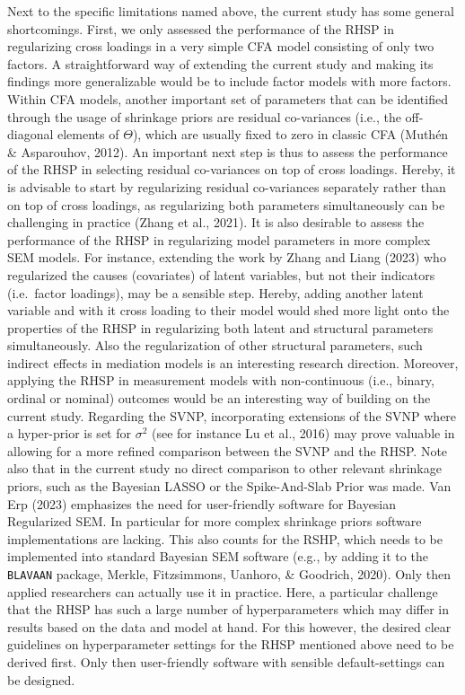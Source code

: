 \documentclass[
  man, donotrepeattitle,floatsintext]{apa6}
\begin{document}
Next to the specific limitations named above, the current study has some
general shortcomings. First, we only assessed the performance of the
RHSP in regularizing cross loadings in a very simple CFA model
consisting of only two factors. A straightforward way of extending the
current study and making its findings more generalizable would be to
include factor models with more factors. Within CFA models, another
important set of parameters that can be identified through the usage of
shrinkage priors are residual co-variances (i.e., the off-diagonal
elements of \(\Theta\)), which are usually fixed to zero in classic CFA
(Muthén \& Asparouhov, 2012). An important next step is thus to assess the
performance of the RHSP in selecting residual co-variances on top of
cross loadings. Hereby, it is advisable to start by regularizing
residual co-variances separately rather than on top of cross loadings,
as regularizing both parameters simultaneously can be challenging in
practice (Zhang et al., 2021). It is also desirable to assess the
performance of the RHSP in regularizing model parameters in more complex
SEM models. For instance, extending the work by Zhang and Liang (2023) who
regularized the causes (covariates) of latent variables, but not their
indicators (i.e.~factor loadings), may be a sensible step. Hereby,
adding another latent variable and with it cross loading to their model
would shed more light onto the properties of the RHSP in regularizing
both latent and structural parameters simultaneously. Also the
regularization of other structural parameters, such indirect effects in
mediation models is an interesting research direction. Moreover,
applying the RHSP in measurement models with non-continuous (i.e.,
binary, ordinal or nominal) outcomes would be an interesting way of
building on the current study. Regarding the SVNP, incorporating
extensions of the SVNP where a hyper-prior is set for \(\sigma^2\) (see
for instance Lu et al., 2016) may prove valuable in allowing for a
more refined comparison between the SVNP and the RHSP. Note also that in
the current study no direct comparison to other relevant shrinkage
priors, such as the Bayesian LASSO or the Spike-And-Slab Prior was made.
Van Erp (2023) emphasizes the need for user-friendly software for
Bayesian Regularized SEM. In particular for more complex shrinkage
priors software implementations are lacking. This also counts for the
RSHP, which needs to be implemented into standard Bayesian SEM software
(e.g., by adding it to the \texttt{BLAVAAN} package, Merkle, Fitzsimmons, Uanhoro, \& Goodrich, 2020).
Only then applied researchers can actually use it in practice. Here, a
particular challenge that the RHSP has such a large number of
hyperparameters which may differ in results based on the data and model
at hand. For this however, the desired clear guidelines on
hyperparameter settings for the RHSP mentioned above need to be derived
first. Only then user-friendly software with sensible default-settings
can be designed.
\end{document}
